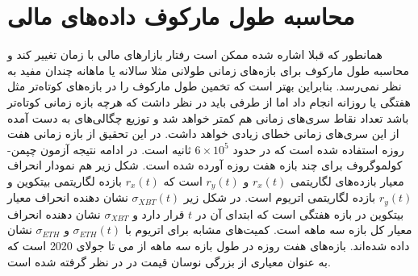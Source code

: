  \section{محاسبه طول مارکوف داده‌های مالی}
 همانطور که قبلا اشاره شده ممکن است رفتار بازارهای مالی با زمان تغییر کند و محاسبه طول مارکوف 
 برای بازه‌های زمانی طولانی مثلا سالانه یا ماهانه چندان مفید به نظر نمی‌رسد. بنابراین بهتر است که 
تخمین طول مارکوف را در بازه‌های کوتاه‌تر مثل هفتگی یا روزانه انجام داد اما از طرفی باید در نظر داشت 
که هرچه بازه زمانی کوتاه‌تر باشد تعداد نقاط سری‌های زمانی هم کمتر خواهد شد و توزیع چگالی‌های به دست آمده 
از این سری‌های زمانی خطای زیادی خواهد داشت. در این تحقیق از بازه زمانی هفت روزه استفاده شده است 
که در حدود $6 \times 10^5$ ثانیه است. در ادامه نتیجه آزمون چپمن-کولموگروف برای چند بازه هفت روزه 
آورده شده است. شکل زیر هم نمودار انحراف معیار بازده‌های لگاریتمی $r_x(t)$ و 
$r_y(t)$ است که $r_x(t)$ بازده لگاریتمی بیتکوین و $r_y(t)$ بازده لگاریتمی اتریوم است. 
در شکل زیر $\sigma_{XBT}(t)$ نشان دهنده انحراف معیار بیتکوین در بازه هفتگی است که ابتدای آن در $t$ 
قرار دارد و $\sigma_{XBT}$ نشان دهنده انحراف معیار کل بازه سه ماهه است. کمیت‌های مشابه برای اتریوم با 
$\sigma_{ETH}(t)$ و $\sigma_{ETH}$ نشان داده شده‌اند.
بازه‌های هفت روزه در طول بازه سه ماهه از می تا جولای 2020 
است که به عنوان معیاری از بزرگی نوسان قیمت در در نظر گرفته شده است.


